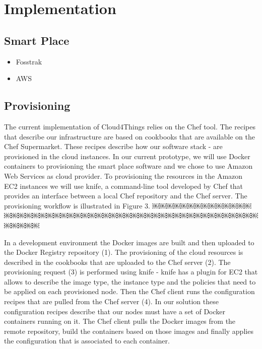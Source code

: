 
\chapter{Implementation}
\label{chapter:implementation}

\section{Smart Place}
\label{sec:Smart Place}

\begin{itemize}
  \item Fosstrak
  \item AWS
\end{itemize}

\section{Provisioning}
\label{sec:provisioning}
The current implementation of Cloud4Things relies on the Chef tool. The recipes that describe our
infrastructure are based on cookbooks that are available on the Chef Supermarket. These recipes
describe how our software stack - are provisioned in the cloud instances. In our current prototype,
we will use Docker containers to provisioning the smart place software and we chose to use Amazon Web
Services as cloud provider. To provisioning the resources in the Amazon EC2 instances we will use knife,
a command-line tool developed by Chef that provides an interface between a local Chef repository and
the Chef server. The provisioning workflow is illustrated in Figure 3. ￼￼￼￼￼￼￼￼￼￼￼￼￼￼￼￼￼￼￼￼￼￼￼￼￼￼￼￼￼￼￼￼￼￼￼￼￼￼￼￼￼￼￼￼￼￼￼￼￼￼￼￼￼￼￼

In a development environment the Docker images are built and then uploaded to the Docker Registry
repository (1). The provisioning of the cloud resources is described in the cookbooks that are uploaded
to the Chef server (2). The provisioning request (3) is performed using knife - knife has a plugin for
EC2 that allows to describe the image type, the instance type and the policies that need to be applied
on each provisioned node. Then the Chef client runs the configuration recipes that are pulled from the
Chef server (4). In our solution these configuration recipes describe that our nodes must have a set
of Docker containers running on it. The Chef client pulls the Docker images from the remote repository,
build the containers based on those images and finally applies the configuration that is associated
to each container.

